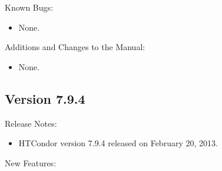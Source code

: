 \noindent Known Bugs:

\begin{itemize}

\item None.

\end{itemize}

\noindent Additions and Changes to the Manual:

\begin{itemize}

\item None.

\end{itemize}


\subsection*{\label{sec:New-7-9-4}Version 7.9.4}

\noindent Release Notes:

\begin{itemize}

\item HTCondor version 7.9.4 released on February 20, 2013.

\end{itemize}


\noindent New Features:

